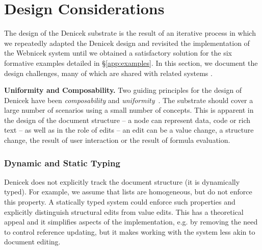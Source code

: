 \documentclass[sigconf]{acmart}
\DeclareRobustCommand{\keyideabox}[3]
{\vspace{\dimexpr\baselineskip\relax} \noindent\colorbox{gray!20}{
\parbox{\dimexpr\columnwidth-\marginparsep+1pt\relax}
{\small {#1} \textbf{#2.} #3}
}}
\begin{document}

\section{Design Considerations}
\label{sec:discuss}

The design of the Denicek substrate is the result of an iterative process in which we repeatedly
adapted the Denicek design and revisited the implementation of the Webnicek system until we obtained
a satisfactory solution for the six formative examples detailed in \S\ref{app:examples}. In this
section, we document the design challenges, many of which are shared with related systems
\cite{jakubovic-2022-ladder,edwards-2005-subtext,hall-2017-infra,omar-2021-livelits}.

\keyideabox{\faCubes}{Uniformity and Composability}{
Two guiding principles for the design of Denicek have been \emph{composability} and
\emph{uniformity}~\cite{jakubovic-2023-techdims}. The substrate should cover a large number of
scenarios using a small number of concepts. This is apparent in the design of the document
structure -- a node can represent data, code or rich text -- as well as in the role of
edits -- an edit can be a value change, a structure change, the result of user interaction
or the result of formula evaluation.
}


\subsubsection*{Dynamic and Static Typing}
Denicek does not explicitly track the document structure (it is dynamically typed). For example, we
assume that lists are homogeneous, but do not enforce this property. A statically typed system could
enforce such properties and explicitly distinguish structural edits from value edits. This has a
theoretical appeal and it simplifies aspects of the implementation, e.g. by removing the need to
control reference updating, but it makes working with the system less akin to document editing.
\end{document}
